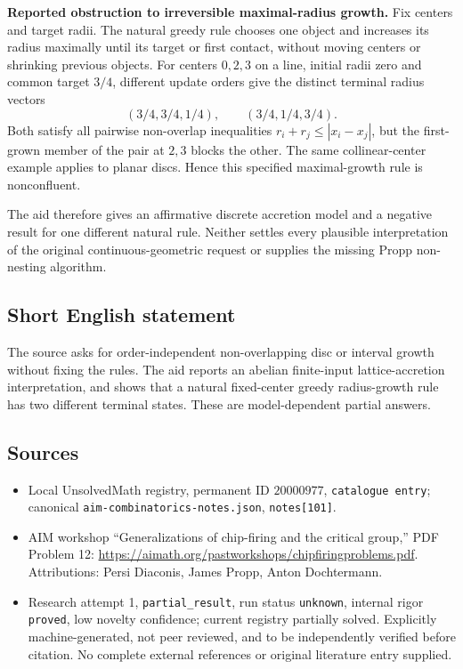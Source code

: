 \documentclass[11pt]{article}
\begin{document}
\textbf{Reported obstruction to irreversible maximal-radius growth.} Fix centers and target radii. The natural greedy rule chooses one object and increases its radius maximally until its target or first contact, without moving centers or shrinking previous objects. For centers $0,2,3$ on a line, initial radii zero and common target $3/4$, different update orders give the distinct terminal radius vectors
\[
 (3/4,3/4,1/4),\qquad(3/4,1/4,3/4).
\]
Both satisfy all pairwise non-overlap inequalities $r_i+r_j\leq|x_i-x_j|$, but the first-grown member of the pair at $2,3$ blocks the other. The same collinear-center example applies to planar discs. Hence this specified maximal-growth rule is nonconfluent.

The aid therefore gives an affirmative discrete accretion model and a negative result for one different natural rule. Neither settles every plausible interpretation of the original continuous-geometric request or supplies the missing Propp non-nesting algorithm.
\subsection{Short English statement}
The source asks for order-independent non-overlapping disc or interval growth without fixing the rules. The aid reports an abelian finite-input lattice-accretion interpretation, and shows that a natural fixed-center greedy radius-growth rule has two different terminal states. These are model-dependent partial answers.
\subsection{Sources}
\begin{itemize}
\item Local UnsolvedMath registry, permanent ID $20000977$, \texttt{catalogue entry}; canonical \texttt{aim-combinatorics-notes.json}, \texttt{notes[101]}.
\item AIM workshop ``Generalizations of chip-firing and the critical group,'' PDF Problem 12: \url{https://aimath.org/pastworkshops/chipfiringproblems.pdf}. Attributions: Persi Diaconis, James Propp, Anton Dochtermann.
\item Research attempt 1, \texttt{partial\_result}, run status \texttt{unknown}, internal rigor \texttt{proved}, low novelty confidence; current registry partially solved. Explicitly machine-generated, not peer reviewed, and to be independently verified before citation. No complete external references or original literature entry supplied.
\end{itemize}
\end{document}
